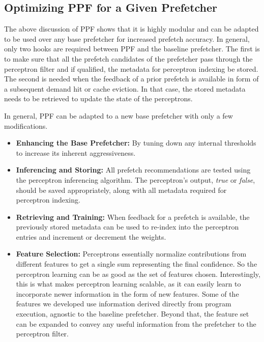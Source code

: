 \subsection{Optimizing PPF for a Given Prefetcher}
\label{Arch-Generalizing}
The above discussion of PPF shows that it is highly modular and can be adapted
to be used over any base prefetcher for increased prefetch accuracy.  In
general, only two hooks are required between PPF and the baseline prefetcher.
The first is to make sure that all the prefetch candidates of the prefetcher
pass through the perceptron filter and if qualified, the metadata for
perceptron indexing be stored. The second is needed when the feedback of a
prior prefetch is available in form of a subsequent demand hit or cache
eviction. In that case, the stored metadata needs to be retrieved to update
the state of the perceptrons.

In general, PPF can be adapted to a new base prefetcher with only a
few modifications.
\begin{itemize}

\item \textbf{Enhancing the Base Prefetcher:} By tuning down any
  internal thresholds to increase its inherent aggressiveness.

\item \textbf{Inferencing and Storing:} All prefetch recommendations
  are tested using the perceptron inferencing algorithm. The
  perceptron's output, \textit{true} or \textit{false}, should be
  saved appropriately, along with all metadata required for perceptron
  indexing.

\item \textbf{Retrieving and Training:} When feedback for a prefetch
  is available, the previously stored metadata can be used to re-index
  into the perceptron entries and increment or decrement the weights.

\item \textbf{Feature Selection:}  Perceptrons essentially normalize
  contributions from different features to get a single sum representing the
  final confidence. So the perceptron learning can be as good as the set of 
  features chosen. Interestingly, this is what makes perceptron learning 
  scalable, as it can easily learn to incorporate newer information in 
  the form of new features. Some of the features we developed use information 
  derived directly from program execution, agnostic to the baseline 
  prefetcher. Beyond that, the feature set can be expanded to convey 
  any useful information from the prefetcher to the perceptron filter. 
  


\end{itemize}
